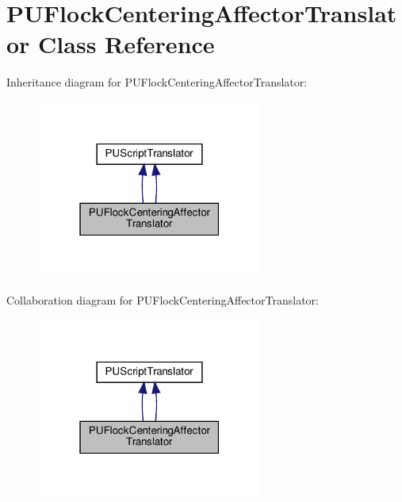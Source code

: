 \hypertarget{classPUFlockCenteringAffectorTranslator}{}\section{P\+U\+Flock\+Centering\+Affector\+Translator Class Reference}
\label{classPUFlockCenteringAffectorTranslator}


Inheritance diagram for P\+U\+Flock\+Centering\+Affector\+Translator\+:
\nopagebreak
\begin{figure}[H]
\begin{center}
\leavevmode
\includegraphics[width=211pt]{classPUFlockCenteringAffectorTranslator__inherit__graph}
\end{center}
\end{figure}


Collaboration diagram for P\+U\+Flock\+Centering\+Affector\+Translator\+:
\nopagebreak
\begin{figure}[H]
\begin{center}
\leavevmode
\includegraphics[width=211pt]{classPUFlockCenteringAffectorTranslator__coll__graph}
\end{center}
\end{figure}
